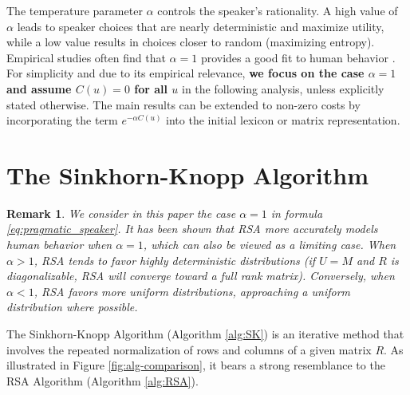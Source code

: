 \documentclass{article}
\newtheorem{remark}{Remark}[section] %
\begin{document}
The temperature parameter $\alpha$ controls the speaker's rationality. A high value of $\alpha$ leads to speaker choices that are nearly deterministic and maximize utility, while a low value results in choices closer to random (maximizing entropy). Empirical studies often find that $\alpha=1$ provides a good fit to human behavior \cite{frank_rational_2016}. For simplicity and due to its empirical relevance, \textbf{we focus on the case $\alpha=1$ and assume $C(u)=0$ for all $u$} in the following analysis, unless explicitly stated otherwise. The main results can be extended to non-zero costs by incorporating the term $e^{-\alpha C(u)}$ into the initial lexicon or matrix representation.

\section{The Sinkhorn-Knopp Algorithm}


\begin{remark}
We consider in this paper the case $\alpha=1$ in formula \ref*{eq:pragmatic_speaker}. It has been shown that RSA more accurately models human behavior when $\alpha=1$, which can also be viewed as a limiting case. When $\alpha>1$, RSA tends to favor highly deterministic distributions (if $U=M$ and $R$ is diagonalizable, RSA will converge toward a full rank matrix). Conversely, when $\alpha<1$, RSA favors more uniform distributions, approaching a uniform distribution where possible.
\end{remark}

The Sinkhorn-Knopp Algorithm (Algorithm \ref*{alg:SK}) is an iterative method that involves the repeated normalization of rows and columns of a given matrix $R$. As illustrated in Figure \ref*{fig:alg-comparison}, it bears a strong resemblance to the RSA Algorithm (Algorithm \ref*{alg:RSA}).
\end{document}

